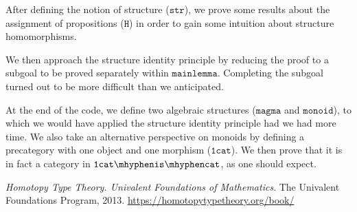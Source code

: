 \documentclass{article}
\begin{document}
After defining the notion of structure ($\mathtt{str}$), we prove some results about the assignment of propositions ($\mathtt{H}$) in order to gain some intuition about structure homomorphisms.

We then approach the structure identity principle by reducing the proof to a subgoal to be proved separately within $\mathtt{mainlemma}$. Completing the subgoal turned out to be more difficult than we anticipated.

At the end of the code, we define two algebraic structures ($\mathtt{magma}$ and $\mathtt{monoid}$), to which we would have applied the structure identity principle had we had more time. We also take an alternative perspective on monoids by defining a precategory with one object and one morphism ($\mathtt{1cat}$). We then prove that it is in fact a category in $\mathtt{1cat \mhyphen is \mhyphen cat}$, as one should expect.

\begin{thebibliography}{1}

 {\em Homotopy Type Theory. Univalent Foundations of Mathematics}. The Univalent Foundations Program, 2013. \href{https://homotopytypetheory.org/book/}{https://homotopytypetheory.org/book/}

\end{thebibliography}
\end{document}
